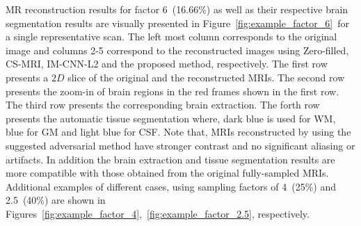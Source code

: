 \documentclass[review]{elsarticle}
\begin{document}
MR reconstruction results for factor 6~(16.66\%) as well as their respective brain segmentation results are visually presented in Figure~\ref{fig:example_factor_6}~for a single representative scan. The left most column corresponds to the original image and columns 2-5 correspond to the reconstructed images using Zero-filled, CS-MRI, IM-CNN-L2 and the proposed method, respectively. The first row presents a $2D$ slice of the original and the reconstructed MRIs. The second row presents the zoom-in of brain regions in the red frames shown in the first row. The third row presents the corresponding brain extraction. The forth row presents the automatic tissue segmentation where, dark blue is used for WM, blue for GM and light blue for CSF. Note that, MRIs reconstructed by using the suggested adversarial method have stronger contrast and no significant aliasing or artifacts. In addition the brain extraction and tissue segmentation results are more compatible with those obtained from the original fully-sampled MRIs. Additional examples of different cases, using sampling factors of 4~(25\%) and 2.5~(40\%) are shown in Figures~\ref{fig:example_factor_4},~\ref{fig:example_factor_2.5}, respectively.
\end{document}
